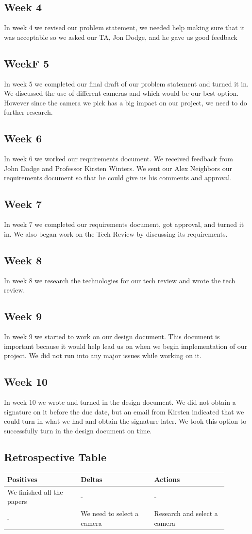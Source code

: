 \documentclass[onecolumn, draftclsnofoot,10pt, compsoc]{IEEEtran}
\begin{document}
\subsection{Week 4}
In week 4 we revised our problem statement, we needed help making sure that it was acceptable so we asked our TA, Jon Dodge, and he gave us good feedback 
\subsection{WeekF 5}
In week 5 we completed our final draft of our problem statement and turned it in.
We discussed the use of different cameras and which would be our best option.
However since the camera we pick has a big impact on our project, we need to do further research.
\subsection{Week 6}
In week 6 we worked our requirements document.
We received feedback from John Dodge and Professor Kirsten Winters.
We sent our Alex Neighbors our requirements document so that he could give us his comments and approval.
\subsection{Week 7}
In week 7 we completed our requirements document, got approval, and turned it in.
We also began work on the Tech Review by discussing its requirements.
\subsection{Week 8}
In week 8 we research the technologies for our tech review and wrote the tech review.
\subsection{Week 9}
In week 9 we started to work on our design document.
This document is important because it would help lead us on when we begin implementation of our project.
We did not run into any major issues while working on it.
\subsection{Week 10}
In week 10 we wrote and turned in the design document.
We did not obtain a signature on it before the due date, but an email from Kirsten indicated that we could turn in what we had and obtain the signature later.
We took this option to successfully turn in the design document on time.

\subsection{Retrospective Table}
\begin{tabular}{|p{0.3\linewidth} |p{0.3\linewidth}|p{0.3\linewidth}|}
\hline 
Positives & Deltas & Actions \\
\hline
We finished all the papers & - & - \\
\hline
- & We need to select a camera & Research and select a camera \\
\hline


\end{tabular}
\end{document}
